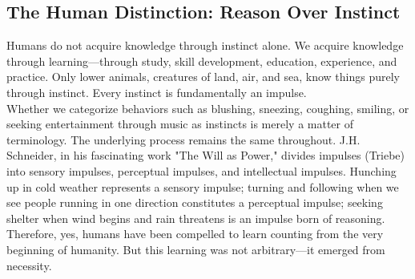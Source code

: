 \subsection{The Human Distinction: Reason Over Instinct}

Humans do not acquire knowledge through instinct alone. We acquire knowledge through learning—through study, skill development, education, experience, and practice. Only lower animals, creatures of land, air, and sea, know things purely through instinct. Every instinct is fundamentally an impulse.\\
Whether we categorize behaviors such as blushing, sneezing, coughing, smiling, or seeking entertainment through music as instincts is merely a matter of terminology. The underlying process remains the same throughout. J.H. Schneider, in his fascinating work "The Will as Power," divides impulses (Triebe) into sensory impulses, perceptual impulses, and intellectual impulses. Hunching up in cold weather represents a sensory impulse; turning and following when we see people running in one direction constitutes a perceptual impulse; seeking shelter when wind begins and rain threatens is an impulse born of reasoning. Therefore, yes, humans have been compelled to learn counting from the very beginning of humanity. But this learning was not arbitrary—it emerged from necessity.

